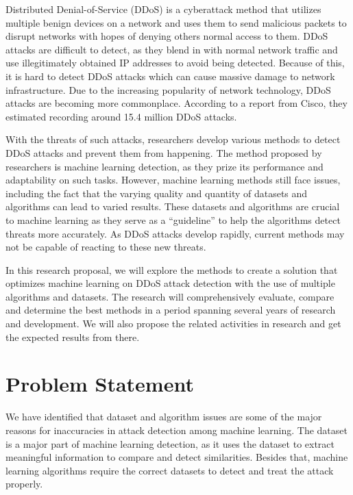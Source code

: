 \documentclass[a4paper, 12pt]{article}
\begin{document}
Distributed Denial-of-Service (DDoS) is a cyberattack method that utilizes multiple benign devices on a network and uses them to send malicious packets to disrupt networks with hopes of denying others normal access to them. DDoS attacks are difficult to detect, as they blend in with normal network traffic and use illegitimately obtained IP addresses to avoid being detected.  Because of this, it is hard to detect DDoS attacks which can cause massive damage to network infrastructure. Due to the increasing popularity of network technology, DDoS attacks are becoming more commonplace. According to a report from Cisco, they estimated recording around 15.4 million DDoS attacks.  

With the threats of such attacks, researchers develop various methods to detect DDoS attacks and prevent them from happening. The method proposed by researchers is machine learning detection, as they prize its performance and adaptability on such tasks. However, machine learning methods still face issues, including the fact that the varying quality and quantity of datasets and algorithms can lead to varied results. These datasets and algorithms are crucial to machine learning as they serve as a “guideline” to help the algorithms detect threats more accurately. As DDoS attacks develop rapidly, current methods may not be capable of reacting to these new threats. 

In this research proposal, we will explore the methods to create a solution that optimizes machine learning on DDoS attack detection with the use of multiple algorithms and datasets. The research will comprehensively evaluate, compare and determine the best methods in a period spanning several years of research and development. We will also propose the related activities in research and get the expected results from there.

\section{Problem Statement}
We have identified that dataset and algorithm issues are some of the major reasons for inaccuracies in attack detection among machine learning. The dataset is a major part of machine learning detection, as it uses the dataset to extract meaningful information to compare and detect similarities. Besides that, machine learning algorithms require the correct datasets to detect and treat the attack properly.  
\end{document}
